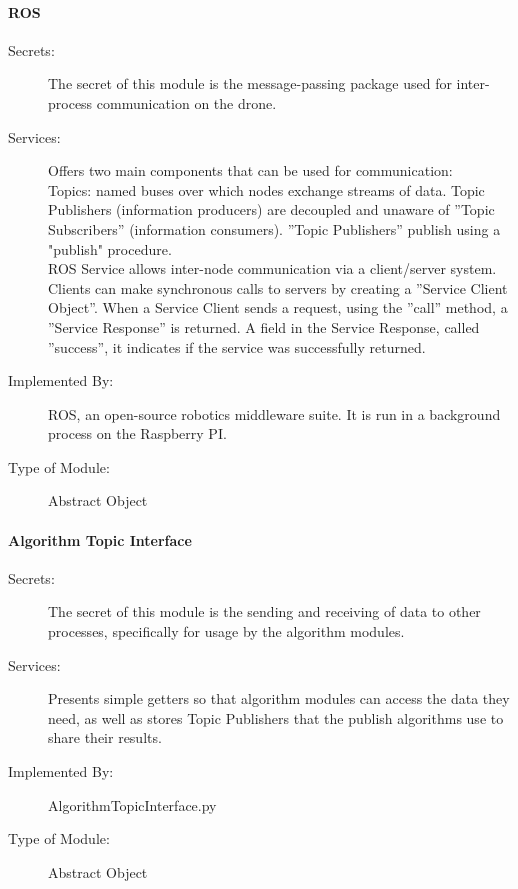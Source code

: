 \documentclass[12pt, titlepage]{article}
\begin{document}
\paragraph{ROS}
\label{ROS}
\begin{description}
\item[Secrets:] The secret of this module is the message-passing package used for inter-process communication on the drone. 
\item[Services:] Offers two main components that can be used for communication: \\
Topics: named buses over which nodes exchange streams of data. Topic Publishers (information producers) are decoupled and unaware of ''Topic Subscribers'' (information consumers). ''Topic Publishers'' publish using a "publish" procedure. \\
 ROS Service allows inter-node communication via a client/server system. Clients can make  synchronous calls to servers by creating a ''Service Client Object''.  When a Service Client sends a request, using the ''call'' method, a ''Service Response'' is returned. A field in the Service Response, called ''success'', it indicates if the service was successfully returned.
\item[Implemented By:] ROS, an open-source robotics middleware suite. It is run in a background process on the Raspberry PI.
\item[Type of Module:] Abstract Object
\end{description}

\paragraph{Algorithm Topic Interface}
\label{Algorithm Topic Interface}
\begin{description}
\item[Secrets:] The secret of this module is the sending and receiving of data to other processes, specifically for usage by the algorithm modules. 
\item[Services:] Presents simple getters so that algorithm modules can access the data they need, as well as stores Topic Publishers that the publish algorithms use to share their results.
\item[Implemented By:] AlgorithmTopicInterface.py
\item[Type of Module:] Abstract Object
\end{description}
\end{document}
